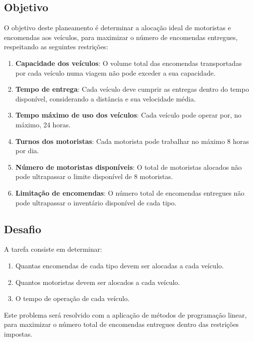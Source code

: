 \subsection{Objetivo}\label{subsec:objetivo}
O objetivo deste planeamento é determinar a alocação ideal de motoristas e encomendas aos veículos, para maximizar o número de encomendas entregues, respeitando as seguintes restrições:
\begin{enumerate}
    \item \textbf{Capacidade dos veículos}: O volume total das encomendas transportadas por cada veículo numa viagem não pode exceder a sua capacidade.
    \item \textbf{Tempo de entrega}: Cada veículo deve cumprir as entregas dentro do tempo disponível, considerando a distância e sua velocidade média.
    \item \textbf{Tempo máximo de uso dos veículos}: Cada veículo pode operar por, no máximo, 24 horas.
    \item \textbf{Turnos dos motoristas}: Cada motorista pode trabalhar no máximo 8 horas por dia.
    \item \textbf{Número de motoristas disponíveis}: O total de motoristas alocados não pode ultrapassar o limite disponível de 8 motoristas.
    \item \textbf{Limitação de encomendas}: O número total de encomendas entregues não pode ultrapassar o inventário disponível de cada tipo.
\end{enumerate}

\subsection{Desafio}\label{subsec:desafio}
A tarefa consiste em determinar:
\begin{enumerate}
    \item Quantas encomendas de cada tipo devem ser alocadas a cada veículo.
    \item Quantos motoristas devem ser alocados a cada veículo.
    \item O tempo de operação de cada veículo.
\end{enumerate}
Este problema será resolvido com a aplicação de métodos de programação linear, para maximizar o número total de encomendas entregues dentro das restrições impostas.